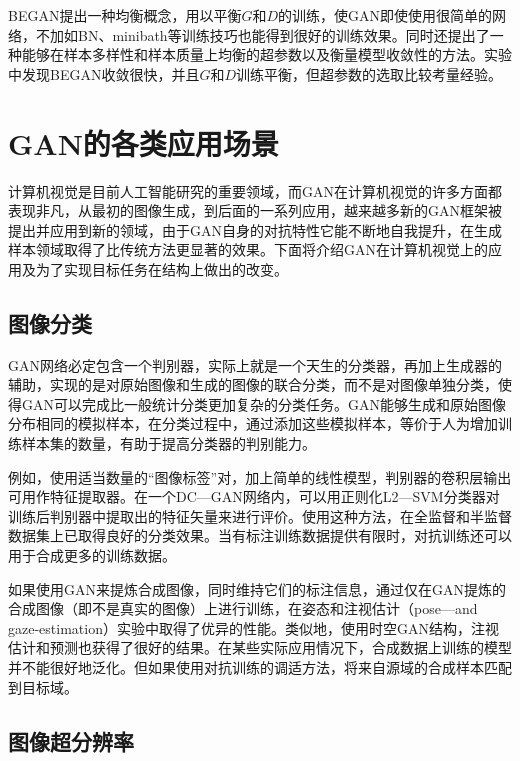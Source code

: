 \documentclass[lang=cn,a4paper,12pt,bibend=biber]{GAN}
\begin{document}
BEGAN提出一种均衡概念，用以平衡$G$和$D$的训练，使GAN即使使用很简单的网络，不加如BN、minibath等训练技巧也能得到很好的训练效果。同时还提出了一种能够在样本多样性和样本质量上均衡的超参数以及衡量模型收敛性的方法。实验中发现BEGAN收敛很快，并且$G$和$D$训练平衡，但超参数的选取比较考量经验。




\section{GAN的各类应用场景}

计算机视觉是目前人工智能研究的重要领域，而GAN在计算机视觉的许多方面都表现非凡，从最初的图像生成，到后面的一系列应用，越来越多新的GAN框架被提出并应用到新的领域，由于GAN自身的对抗特性它能不断地自我提升，在生成样本领域取得了比传统方法更显著的效果。下面将介绍GAN在计算机视觉上的应用及为了实现目标任务在结构上做出的改变。

\subsection{图像分类}

GAN网络必定包含一个判别器，实际上就是一个天生的分类器，再加上生成器的辅助，实现的是对原始图像和生成的图像的联合分类，而不是对图像单独分类，使得GAN可以完成比一般统计分类更加复杂的分类任务。GAN能够生成和原始图像分布相同的模拟样本，在分类过程中，通过添加这些模拟样本，等价于人为增加训练样本集的数量，有助于提高分类器的判别能力。

例如，使用适当数量的“图像标签”对，加上简单的线性模型，判别器的卷积层输出可用作特征提取器。在一个DC—GAN网络内，可以用正则化L2—SVM分类器对训练后判别器中提取出的特征矢量来进行评价。使用这种方法，在全监督和半监督数据集上已取得良好的分类效果。当有标注训练数据提供有限时，对抗训练还可以用于合成更多的训练数据。

如果使用GAN来提炼合成图像，同时维持它们的标注信息，通过仅在GAN提炼的合成图像（即不是真实的图像）上进行训练，在姿态和注视估计（pose—and gaze-estimation）实验中取得了优异的性能。类似地，使用时空GAN结构，注视估计和预测也获得了很好的结果。在某些实际应用情况下，合成数据上训练的模型并不能很好地泛化。但如果使用对抗训练的调适方法，将来自源域的合成样本匹配到目标域。

\subsection{图像超分辨率}
\end{document}
